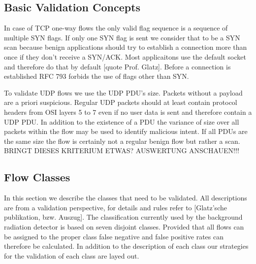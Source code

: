 \documentclass[a4paper]{scrartcl}
\begin{document}
\subsection{Basic Validation Concepts}
In case of TCP one-way flows the only valid flag sequence is a sequence of multiple SYN flags. If only one SYN flag is sent we consider that to be a SYN scan because benign applications should try to establish a connection more than once if they don't receive a SYN/ACK. Most applicaitons use the default socket and therefore do that by default [quote Prof. Glatz]. Before a connection is established RFC 793 \cite{rfc_tcp} forbids the use of flags other than SYN. 

To validate UDP flows we use the UDP PDU's size. Packets without a payload are a priori suspicious. Regular UDP packets should at least contain protocol headers from OSI layers 5 to 7 even if no user data is sent and therefore contain a UDP PDU.
In addition to the existence of a PDU the variance of size over all packets within the flow may be used to identify malicious intent. If all PDUs are the same size the flow is certainly not a regular benign flow but rather a scan. BRINGT DIESES KRITERIUM ETWAS? AUSWERTUNG ANSCHAUEN!!!

\subsection{Flow Classes}
In this section we describe the classes that need to be validated. All descriptions are from a validation perspective, for details and rules refer to [Glatz'sche publikation, bzw. Auszug]. The classification currently used by the background radiation detector is based on seven disjoint classes. Provided that all flows can be assigned to the proper class false negative and false positive rates can therefore be calculated. In addition to the description of each class our strategies for the validation of each class are layed out.
\end{document}
